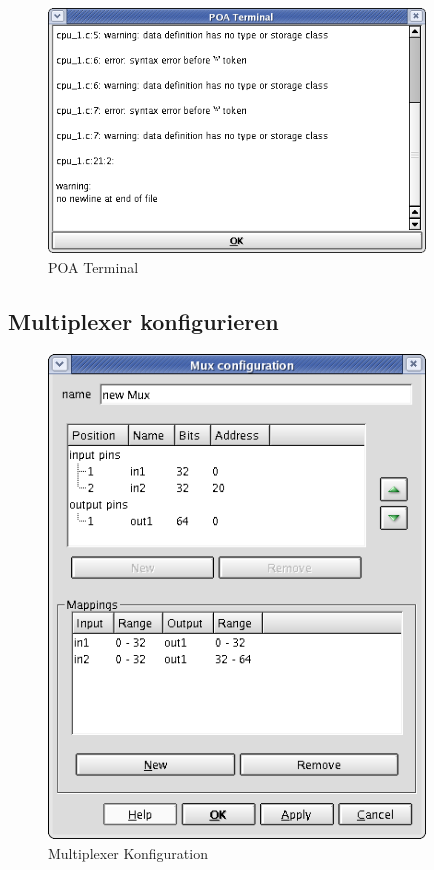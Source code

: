\documentclass[a4paper,titlepage,12pt,ngerman]{scrbook}
\begin{document}
\begin{figure}[htbp]

\begin{center}

\includegraphics[width=10cm]{Terminal}

\caption{POA Terminal}\label{test}

\end{center}

\end{figure}
\newpage



\subsection{Multiplexer konfigurieren}
\begin{figure}[htbp]

\begin{center}

\includegraphics[width=10cm]{MuxConfiguration}

\caption{Multiplexer Konfiguration}\label{test}

\end{center}

\end{figure}
\end{document}
